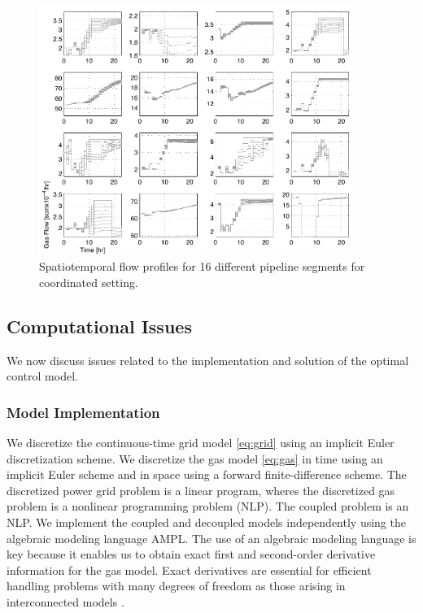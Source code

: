 \documentclass[11pt,twoside]{article}
\begin{document}
\begin{figure}[h!]
\begin{center}
\includegraphics[width=4in]{flow_coupled.pdf}\caption{Spatiotemporal flow profiles for 16 different pipeline segments for coordinated setting.}\label{flow_coupled}
\end{center}
\end{figure}

\subsection{Computational Issues}

We now discuss issues related to the implementation and solution of the optimal control model. 

\subsubsection{Model Implementation}

We discretize the continuous-time grid model \eqref{eq:grid} using an implicit Euler discretization scheme. We discretize the gas model \eqref{eq:gas} in time using an implicit Euler scheme and in space using a forward finite-difference scheme. The discretized power grid problem is a linear program, wheres the discretized gas problem is a nonlinear programming problem (NLP).  The coupled problem is an NLP.  We implement the coupled and decoupled models independently using the algebraic modeling language AMPL. The use of an algebraic modeling language is key because it enables us to obtain exact first and second-order derivative information for the gas model.  Exact derivatives are essential for efficient handling problems with many degrees of freedom as those arising in interconnected models \cite{zavalapavia}. 
\end{document}
